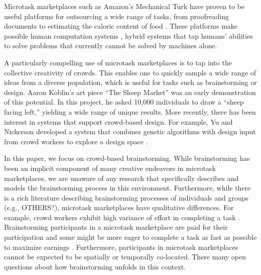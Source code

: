 
Microtask marketplaces such as Amazon's Mechanical Turk have proven to be useful platforms for outsourcing a wide range of tasks, from proofreading documents \cite{soylent} to estimating the caloric content of food \cite{platemate}.  These platforms make possible human computation systems \cite{quinn_2011}, hybrid systems that tap humans' abilities to solve problems that currently cannot be solved by machines alone.

A particularly compelling use of microtask marketplaces is to tap into the collective creativity of crowds. This enables one to quickly sample a wide range of ideas from a diverse population, which is useful for tasks such as brainstorming or design. Aaron Koblin's art piece ``The Sheep Market'' \cite{koblin_2009} was an early demonstration of this potential. In this project, he asked 10,000 individuals to draw a ``sheep facing left,'' yielding a wide range of unique results. More recently, there has been interest in systems that support crowd-based design. For example, Yu and Nickerson developed a system that combines genetic algorithms with design input from crowd workers to explore a design space \cite{yu_cooks_2011}. 

In this paper, we focus on crowd-based brainstorming. While brainstorming has been an implicit component of many creative endeavors in microtask marketplaces, we are unaware of any research that specifically describes and models the brainstorming process in this environment. Furthermore, while there is a rich literature describing brainstorming processes of individuals and groups (e.g., \cite{osborn_applied_1957, pinsonneault_electronic_1999, nijstad_how_2006} OTHERS?), microtask marketplaces have qualitative differences. For example, crowd workers exhibit high variance of effort in completing a task \cite{soylent}. Brainstorming participants in a microtask marketplace are paid for their participation and some might be more eager to complete a task as fast as possible to maximize earnings \cite{kittur2008crowdsourcing}. Furthermore, participants in microtask marketplaces cannot be expected to be spatially or temporally co-located. There many open questions about how brainstorming unfolds in this context.

